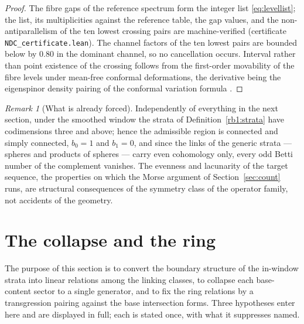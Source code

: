 \documentclass[11pt]{article}
\numberwithin{equation}{section}
\theoremstyle{plain}
\theoremstyle{definition}
\theoremstyle{remark}
\newtheorem{remark}[theorem]{Remark}
\begin{document}
\begin{proof}
The fibre gaps of the reference spectrum form the integer list
\eqref{eq:levellist}; the list, its multiplicities against the
reference table, the gap values, and the non-antiparallelism of the
ten lowest crossing pairs are machine-verified (certificate
\texttt{NDC\_certificate.lean}). The channel factors of the ten
lowest pairs are bounded below by $0.80$ in the dominant channel,
so no cancellation occurs. Interval rather than point existence of
the crossing follows from the first-order movability of the fibre
levels under mean-free conformal deformations, the derivative being
the eigenspinor density pairing of the conformal variation formula
\cite{BourguignonGauduchon1992}.
\end{proof}

\begin{remark}[What is already forced]\label{rb1:free}
Independently of everything in the next section, under the smoothed
window the strata of Definition~\textup{\ref{rb1:strata}} have
codimensions three and above; hence the admissible region is
connected and simply connected, $b_{0} = 1$ and $b_{1} = 0$, and
since the links of the generic strata --- spheres and products of
spheres --- carry even cohomology only, every odd Betti number of
the complement vanishes. The evenness and lacunarity of the target
sequence, the properties on which the Morse argument of
Section~\ref{sec:count} runs, are structural consequences of the
symmetry class of the operator family, not accidents of the
geometry.
\end{remark}

\section{The collapse and the ring}\label{sec:collapse}

The purpose of this section is to convert the boundary structure of
the in-window strata into linear relations among the linking
classes, to collapse each base-content sector to a single
generator, and to fix the ring relations by a transgression pairing
against the base intersection forms. Three hypotheses enter here
and are displayed in full; each is stated once, with what it
suppresses named.
\end{document}
